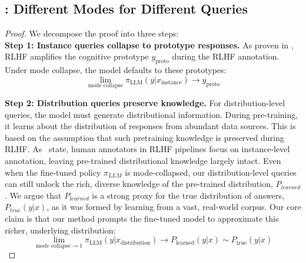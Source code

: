 \subsection{: Different Modes for Different Queries} \label{appendix:different_modes_for_different_queries}
\begin{proof} 
We decompose the proof into three steps: \\

\textbf{Step 1: Instance queries collapse to prototype responses.}
As proven in ,
RLHF amplifies the cognitive prototype $y_{\text{proto}}$ during the RLHF annotation. Under mode collapse, the model defaults to these prototypes:
\begin{equation}
\lim_{\text{mode collapse}} \pi_{\text{LLM}}(y|x_{\text{instance}}) \rightarrow y_{\text{proto}}
\end{equation}

\textbf{Step 2: Distribution queries preserve knowledge.} 
For distribution-level queries,
the model must generate distributional information. During pre-training, it learns about the distribution of responses from abundant data sources. This is based on the assumption that such pretraining knowledge is preserved during RLHF.
As~\citet{sorensen2024roadmappluralisticalignment,xiao2024algorithmicbiasaligninglarge} state, human annotators in RLHF pipelines focus on instance-level annotation, leaving pre-trained distributional knowledge largely intact.
Even when the fine-tuned policy $\pi_{LLM}$ is mode-collapsed, our distribution-level queries can still unlock the rich, diverse knowledge of the pre-trained distribution, $P_{learned}$. We argue that $P_{learned}$ is a strong proxy for the true distribution of answers, $P_{true}(y|x)$, as it was formed by learning from a vast, real-world corpus. Our core claim is that our method prompts the fine-tuned model to approximate this richer, underlying distribution:
\begin{equation}
\lim_{\text{mode collapse} \to 1}  \pi_{\text{LLM}}(y|x_{\text{distribution}}) \rightarrow P_{\text{learned}}(y|x) \sim P_{\text{true}}(y|x)
\end{equation}


\end{proof}

